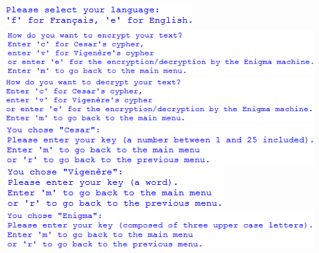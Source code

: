 \documentclass[a4paper,12pt,abstracton,titlepage]{scrartcl}
\begin{document}
{	%
\vspace{1cm}
\includegraphics{./Pictures/interface/settingsDialogue.png}		%
\vspace{1cm}
\includegraphics{./Pictures/interface/english/03_english_cryptage.png}	%
\vspace{1cm}
\includegraphics{./Pictures/interface/english/03_english_decryptage.png}	%
\vspace{1cm}
\includegraphics{./Pictures/interface/english/04_english_cesar.png}		%
\vspace{1cm}
\includegraphics{./Pictures/interface/english/04_english_vigenere.png}	%
\vspace{1cm}
\includegraphics{./Pictures/interface/english/04_english_enigma.png}		%
}
\end{document}
